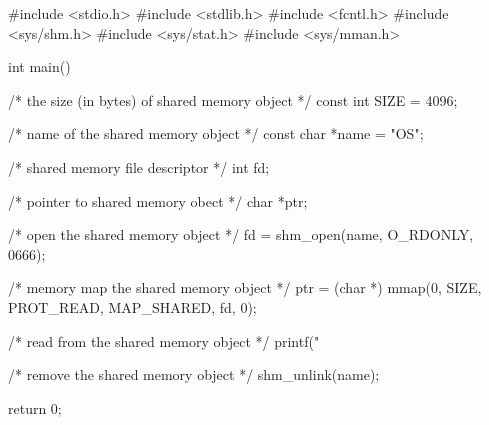 \begin{clang}
#include <stdio.h>
#include <stdlib.h>
#include <fcntl.h>
#include <sys/shm.h>
#include <sys/stat.h>
#include <sys/mman.h>

int main(){
  /* the size (in bytes) of shared memory object */
  const int SIZE = 4096;

  /* name of the shared memory object */
  const char *name = "OS";

  /* shared memory file descriptor */
  int fd;

  /* pointer to shared memory obect */
  char *ptr;

  /* open the shared memory object */
  fd = shm_open(name, O_RDONLY, 0666);
  
  /* memory map the shared memory object */
  ptr = (char *)
  mmap(0, SIZE, PROT_READ, MAP_SHARED, fd, 0);

  /* read from the shared memory object */
  printf("%

  /* remove the shared memory object */
  shm_unlink(name);

  return 0;
}
\end{clang}
